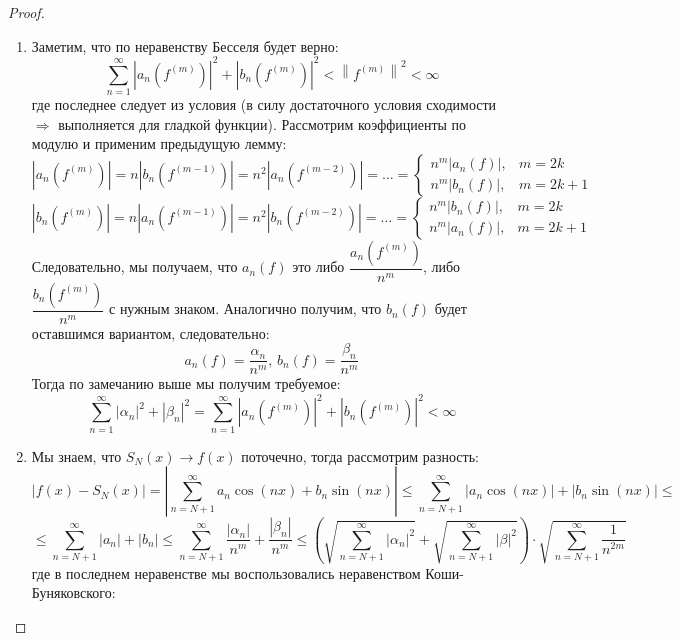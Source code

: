\documentclass[12pt]{article}
\theoremstyle{definition}
\newcommand{\ddsum}[2]{\displaystyle\sum\limits_{#1}^{#2}}
\begin{document}
\begin{proof}\hfill
	\begin{enumerate}[label=\arabic*)]
		\item Заметим, что по неравенству Бесселя будет верно:
		$$
			\ddsum{n = 1}{\infty}\left|a_n\left(f^{(m)}\right)\right|^2 + \left|b_n\left(f^{(m)}\right)\right|^2 < \left\|f^{(m)}\right\|^2 < \infty
		$$
		где последнее следует из условия (в силу достаточного условия сходимости $\Rightarrow$ выполняется для гладкой функции). Рассмотрим коэффициенты по модулю и применим предыдущую лемму:
		$$
			\left|a_n\left(f^{(m)}\right)\right| = n\left|b_n\left(f^{(m-1)}\right)\right| = n^2\left|a_n\left(f^{(m-2)}\right)\right| = \dotsc = \left\{
			\begin{array}{rl}
				n^m\left|a_n\left(f\right)\right|, & m = 2k\\[5pt]
				n^m\left|b_n\left(f\right)\right|, & m = 2k + 1
			\end{array}
			\right.
		$$
		$$
			\left|b_n\left(f^{(m)}\right)\right| = n\left|a_n\left(f^{(m-1)}\right)\right| = n^2\left|b_n\left(f^{(m-2)}\right)\right| = \dotsc = \left\{
			\begin{array}{rl}
				n^m\left|b_n\left(f\right)\right|, & m = 2k\\[5pt]
				n^m\left|a_n\left(f\right)\right|, & m = 2k + 1
			\end{array}
			\right.
		$$
		Следовательно, мы получаем, что $a_n(f)$ это либо $\dfrac{a_n\left(f^{(m)}\right)}{n^m}$, либо $\dfrac{b_n\left(f^{(m)}\right)}{n^m}$ с нужным знаком. Аналогично получим, что $b_n(f)$ будет оставшимся вариантом, следовательно:
		$$
			a_n(f) = \dfrac{\alpha_n}{n^m}, \, b_n(f) = \dfrac{\beta_n}{n^m}
		$$
		Тогда по замечанию выше мы получим требуемое:
		$$
			\ddsum{n = 1}{\infty}|\alpha_n|^2 + |\beta_n|^2 = \ddsum{n = 1}{\infty}\left|a_n\left(f^{(m)}\right)\right|^2 + \left|b_n\left(f^{(m)}\right)\right|^2 < \infty
		$$
		\item Мы знаем, что $S_N(x) \to f(x)$ поточечно, тогда рассмотрим разность:
		$$
			\left|f(x) - S_N(x)\right| = \left|\ddsum{n = N+ 1}{\infty}a_n\cos{(nx)} + b_n\sin{(nx)}\right| \leq \ddsum{n = N+ 1}{\infty}\left|a_n\cos{(nx)}\right| + \left|b_n\sin{(nx)}\right| \leq
		$$
		$$
			\leq \ddsum{n = N+ 1}{\infty}|a_n| + |b_n| \leq \ddsum{n = N + 1}{\infty}\dfrac{|\alpha_n|}{n^m} + \dfrac{|\beta_n|}{n^m} \leq \left(\sqrt{\ddsum{n = N+ 1}{\infty}|\alpha_n|^2} + \sqrt{\ddsum{n = N+ 1}{\infty}|\beta|^2}\right){\cdot}\sqrt{\ddsum{n = N + 1}{\infty}\dfrac{1}{n^{2m}}}
		$$
		где в последнем неравенстве мы воспользовались неравенством Коши-Буняковского: 

\end{enumerate}
\end{proof}
\end{document}
